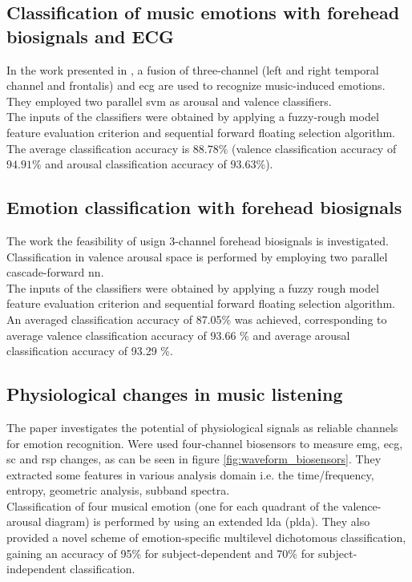 \subsection{Classification of music emotions with  forehead biosignals and ECG}
In the work presented in \cite{naji2014classification}, a fusion of three-channel (left and right  temporal channel and frontalis) and \gls{ecg} are used to recognize music-induced emotions. They employed two parallel \gls{svm} as arousal and valence classifiers.
\\ \indent
The inputs of the classifiers were obtained by applying a fuzzy-rough model feature evaluation criterion and sequential forward floating selection algorithm.
\\
The average classification accuracy is $88.78\%$ (valence classification accuracy of $94.91\%$ and arousal classification accuracy of $93.63\%$).

\subsection{Emotion classification with forehead biosignals}
The work \cite{naji2015emotion} the feasibility of usign 3-channel forehead biosignals is investigated. Classification in valence arousal space is performed by employing two parallel cascade-forward \gls{nn}.
\\
The inputs of the classifiers were obtained by applying a fuzzy rough model feature evaluation criterion and sequential forward floating selection algorithm. An averaged classification accuracy of 87.05\% was achieved, corresponding to average valence classification accuracy of 93.66 \% and average arousal classification accuracy of 93.29 \%.

\subsection{Physiological changes in music listening}
The paper \cite{kim2008emotion} investigates the potential of physiological signals as reliable channels for emotion recognition. Were used four-channel biosensors to measure \gls{emg}, \gls{ecg}, \gls{sc} and \gls{rsp} changes, as can be seen in figure \ref{fig:waveform_biosensors}. They extracted some features in various analysis domain i.e. the time/frequency, entropy, geometric analysis, subband spectra.
\\ \indent
Classification of four musical emotion (one for each quadrant of the valence-arousal diagram) is performed by using an extended \gls{lda} (p\gls{lda}). They also provided a novel scheme of emotion-specific multilevel dichotomous classification, gaining an accuracy of 95\% for subject-dependent and 70\% for subject-independent classification.
 
